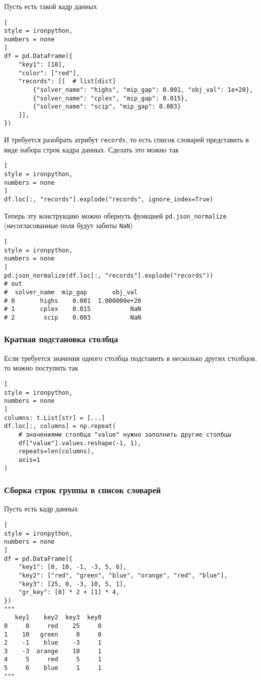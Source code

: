 \documentclass[%
	11pt,
	a4paper,
	utf8,
		]{article}
\begin{document}
Пусть есть такой кадр данных
\begin{lstlisting}[
style = ironpython,
numbers = none
]
df = pd.DataFrame({
	"key1": [10],
	"color": ["red"],
	"records": [[  # list[dict]
	    {"solver_name": "highs", "mip_gap": 0.001, "obj_val": 1e+20},
	    {"solver_name": "cplex", "mip_gap": 0.015},
	    {"solver_name": "scip", "mip_gap": 0.003}
	]],
})

\end{lstlisting}

И требуется разобрать атрибут \verb|records|, то есть список словарей представить в виде набора строк кадра данных. Сделать это можно так
\begin{lstlisting}[
style = ironpython,
numbers = none
]
df.loc[:, "records"].explode("records", ignore_index=True)
\end{lstlisting}

Теперь эту конструкцию можно обернуть функцией \verb*|pd.json_normalize| (несогласованные поля будут забиты \verb|NaN|)
\begin{lstlisting}[
style = ironpython,
numbers = none
]
pd.json_normalize(df.loc[:, "records"].explode("records"))
# out
#  solver_name  mip_gap       obj_val
# 0       highs    0.001  1.000000e+20
# 1       cplex    0.015           NaN
# 2        scip    0.003           NaN
\end{lstlisting}

\subsubsection{Кратная подстановка столбца}

Если требуется значения одного столбца подставить в несколько других столбцов, то можно поступить так
\begin{lstlisting}[
style = ironpython,
numbers = none
]
columns: t.List[str] = [...]
df.loc[:, columns] = np.repeat(
    # значениями столбца "value" нужно заполнить другие столбцы
    df["value"].values.reshape(-1, 1),
    repeats=len(columns),
    axis=1
)
\end{lstlisting}

\subsubsection{Сборка строк группы в список словарей}

Пусть есть кадр данных
\begin{lstlisting}[
style = ironpython,
numbers = none
]
df = pd.DataFrame({
    "key1": [0, 10, -1, -3, 5, 6],
    "key2": ["red", "green", "blue", "orange", "red", "blue"],
    "key3": [25, 0, -3, 10, 5, 1],
    "gr_key": [0] * 2 + [1] * 4,
})
"""
   key1    key2  key3  key0
0     0     red    25     0
1    10   green     0     0
2    -1    blue    -3     1
3    -3  orange    10     1
4     5     red     5     1
5     6    blue     1     1
"""
\end{lstlisting}
\end{document}
